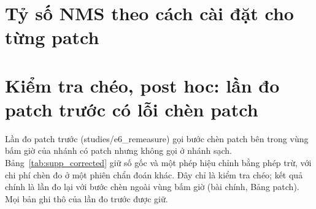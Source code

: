 \documentclass[11pt,a4paper]{article}
\begin{document}


\section{Tỷ số NMS theo cách cài đặt cho từng patch}


\section{Kiểm tra chéo, post hoc: lần đo patch trước có lỗi chèn patch}
Lần đo patch trước (studies/e6\_remeasure) gọi bước chèn patch bên trong vùng bấm giờ của nhánh có patch nhưng không gọi ở nhánh sạch. Bảng~\ref{tab:supp_corrected} giữ số gốc và một phép hiệu chỉnh bằng phép trừ, với chi phí chèn đo ở một phiên chẩn đoán khác. Đây chỉ là kiểm tra chéo; kết quả chính là lần đo lại với bước chèn ngoài vùng bấm giờ (bài chính, Bảng patch). Mọi bản ghi thô của lần đo trước được giữ.


\end{document}
